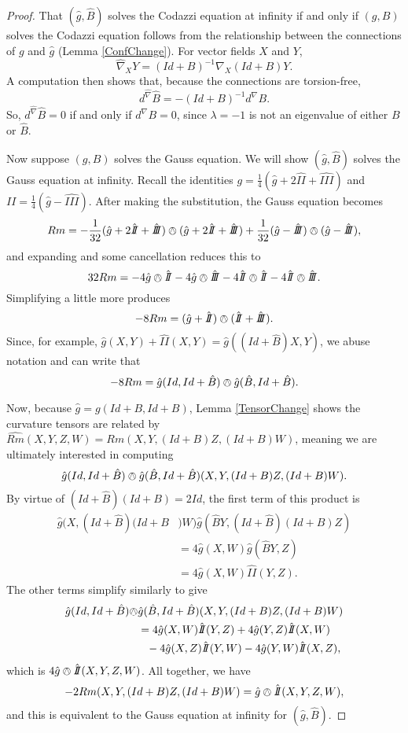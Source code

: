 \documentclass{amsart}
\newcommand{\two}{I\!\!I}
\newcommand{\three}{I\!\!I\!\!I}
\numberwithin{equation}{section}
\begin{document}
\begin{proof}
That $(\hat{g},\hat{B})$ solves the Codazzi equation at infinity if and only if $(g,B)$ solves the Codazzi equation follows from the relationship between the connections of $g$ and $\hat{g}$ (Lemma \ref{ConfChange}). 
For vector fields $X$ and $Y$,
\[
\widehat{\nabla}_XY = (Id+B)^{-1}\nabla_X(Id+B)Y.
\]
A computation then shows that, because the connections are torsion-free,
\[
d^{\widehat{\nabla}}\hat{B} = -(Id+B)^{-1}d^\nabla B.
\]
So, $d^{\widehat{\nabla}}\hat{B} = 0$ if and only if $d^\nabla B = 0$, since $\lambda = -1$ is not an eigenvalue of either $B$ or $\hat{B}$.

Now suppose $(g,B)$ solves the Gauss equation. 
We will show $(\hat{g},\hat{B})$ solves the Gauss equation at infinity. 
Recall the identities $g = \frac{1}{4}(\hat{g} + 2 \hat{\two} + \hat{\three})$ and $\two = \frac{1}{4}(\hat{g} - \hat{\three})$.
After making the substitution, the Gauss equation becomes 
\[
Rm = -\frac{1}{32}(\hat{g} + 2 \hat{\two} + \hat{\three})\owedge(\hat{g} + 2 \hat{\two} + \hat{\three}) + \frac{1}{32}(\hat{g} - \hat{\three})\owedge(\hat{g} - \hat{\three}),
\]
and expanding and some cancellation reduces this to
\[
32Rm = -4\hat{g}\owedge \hat{\two} -4 \hat{g} \owedge \hat{\three} - 4 \hat{\two}\owedge\hat{\two} - 4 \hat{\two}\owedge\hat{\three}.
\] 
Simplifying a little more produces
\[
-8Rm = (\hat{g} + \hat{\two})\owedge (\hat{\two} + \hat{\three}).
\]
Since, for example, $\hat{g}(X,Y) + \hat{\two}(X,Y) = \hat{g}((Id + \hat{B})X,Y)$, we abuse notation and can write that
\[
-8Rm = \hat{g}(Id, Id + \hat{B})\owedge \hat{g}(\hat{B}, Id + \hat{B}).
\]

Now, because $\hat{g} = g(Id + B, Id + B)$, Lemma \ref{TensorChange} shows the curvature tensors are related by $\widehat{Rm}(X,Y,Z,W) = Rm(X,Y,(Id+B)Z,(Id+B)W)$, meaning we are ultimately interested in computing
\[
\hat{g}(Id, Id + \hat{B})\owedge \hat{g}(\hat{B}, Id + \hat{B})(X,Y,(Id+B)Z,(Id+B)W).
\]
By virtue of $(Id + \hat{B})(Id+B) = 2 Id$, the first term of this product is 
\begin{align*}
\hat{g}(X,(Id + \hat{B})(Id+B&)W)\hat{g}(\hat{B}Y,(Id + \hat{B})(Id+B)Z) \\
&= 4\hat{g}(X,W)\hat{g}(\hat{B}Y,Z) \\
&= 4 \hat{g}(X,W)\hat{\two}(Y,Z).
\end{align*}
The other terms simplify similarly to give
\begin{align*}
\hat{g}(Id, Id + \hat{B})\owedge &\hat{g}(\hat{B}, Id + \hat{B})(X,Y,(Id+B)Z,(Id+B)W) \\
&= 4 \hat{g}(X,W)\hat{\two}(Y,Z) + 4 \hat{g}(Y,Z)\hat{\two}(X,W) \\
&\phantom{=} -4 \hat{g}(X,Z)\hat{\two}(Y,W) - 4 \hat{g}(Y,W)\hat{\two}(X,Z),
\end{align*}
which is $4\hat{g}\owedge\hat{\two}(X,Y,Z,W)$.
All together, we have
\[
-2Rm(X,Y,(Id+B)Z,(Id+B)W) = \hat{g}\owedge\hat{\two}(X,Y,Z,W),
\]
and this is equivalent to the Gauss equation at infinity for $(\hat{g},\hat{B})$.


\end{proof}
\end{document}
